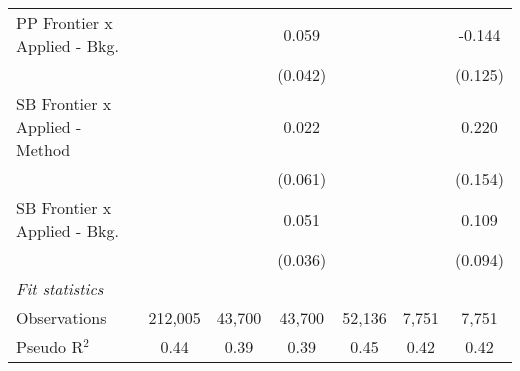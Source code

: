 \begin{tabular}{lcccccc}
   PP Frontier x Applied - Bkg.   &              &              & 0.059          &              &         & -0.144\\   
                                  &              &              & (0.042)        &              &         & (0.125)\\   
   SB Frontier x Applied - Method &              &              & 0.022          &              &         & 0.220\\   
                                  &              &              & (0.061)        &              &         & (0.154)\\   
   SB Frontier x Applied - Bkg.   &              &              & 0.051          &              &         & 0.109\\   
                                  &              &              & (0.036)        &              &         & (0.094)\\   
   \midrule
   \emph{Fit statistics}\\
   Observations                   & 212,005      & 43,700       & 43,700         & 52,136       & 7,751   & 7,751\\  
   Pseudo R$^2$                   & 0.44         & 0.39         & 0.39           & 0.45         & 0.42    & 0.42\\  
   

\end{tabular}
